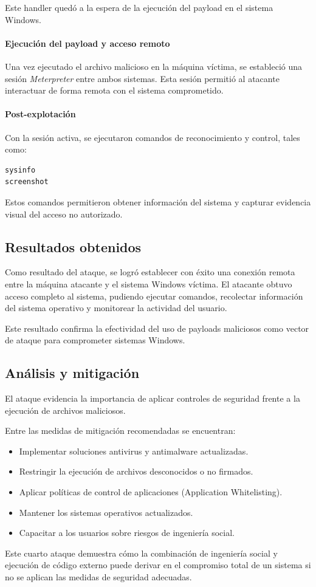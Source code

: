 Este handler quedó a la espera de la ejecución del payload en el sistema Windows.

\paragraph{Ejecución del payload y acceso remoto}

Una vez ejecutado el archivo malicioso en la máquina víctima, se estableció una sesión \textit{Meterpreter} entre ambos sistemas.  
Esta sesión permitió al atacante interactuar de forma remota con el sistema comprometido.

\paragraph{Post-explotación}

Con la sesión activa, se ejecutaron comandos de reconocimiento y control, tales como:

\begin{lstlisting}[caption={Comandos de post-explotación}]
sysinfo
screenshot
\end{lstlisting}

Estos comandos permitieron obtener información del sistema y capturar evidencia visual del acceso no autorizado.

\subsection{Resultados obtenidos}

Como resultado del ataque, se logró establecer con éxito una conexión remota entre la máquina atacante y el sistema Windows víctima.  
El atacante obtuvo acceso completo al sistema, pudiendo ejecutar comandos, recolectar información del sistema operativo y monitorear la actividad del usuario.

Este resultado confirma la efectividad del uso de payloads maliciosos como vector de ataque para comprometer sistemas Windows.

\subsection{Análisis y mitigación}

El ataque evidencia la importancia de aplicar controles de seguridad frente a la ejecución de archivos maliciosos.

Entre las medidas de mitigación recomendadas se encuentran:

\begin{itemize}
    \item Implementar soluciones antivirus y antimalware actualizadas.
    \item Restringir la ejecución de archivos desconocidos o no firmados.
    \item Aplicar políticas de control de aplicaciones (Application Whitelisting).
    \item Mantener los sistemas operativos actualizados.
    \item Capacitar a los usuarios sobre riesgos de ingeniería social.
\end{itemize}

Este cuarto ataque demuestra cómo la combinación de ingeniería social y ejecución de código externo puede derivar en el compromiso total de un sistema si no se aplican las medidas de seguridad adecuadas.
